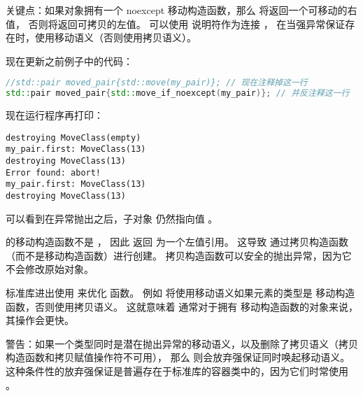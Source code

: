 \documentclass[../../LearnCpp.tex]{subfiles}
\begin{document}
关键点：如果对象拥有一个 noexcept 移动构造函数，那么  将返回一个可移动的右值，
否则将返回可拷贝的左值。
可以使用  说明符作为连接 ，
在当强异常保证存在时，使用移动语义（否则使用拷贝语义）。

现在更新之前例子中的代码：

\begin{lstlisting}[language=C++]
//std::pair moved_pair{std::move(my_pair)}; // 现在注释掉这一行
std::pair moved_pair{std::move_if_noexcept(my_pair)}; // 并反注释这一行
\end{lstlisting}

现在运行程序再打印：

\begin{lstlisting}
destroying MoveClass(empty)
my_pair.first: MoveClass(13)
destroying MoveClass(13)
Error found: abort!
my_pair.first: MoveClass(13)
destroying MoveClass(13)
\end{lstlisting}

可以看到在异常抛出之后，子对象  仍然指向值 。

 的移动构造函数不是 ，
因此  返回  为一个左值引用。
这导致  通过拷贝构造函数（而不是移动构造函数）进行创建。
拷贝构造函数可以安全的抛出异常，因为它不会修改原始对象。

标准库进出使用  来优化  函数。
例如  将使用移动语义如果元素的类型是  移动构造函数，否则使用拷贝语义。
这就意味着  通常对于拥有  移动构造函数的对象来说，其操作会更快。

警告：如果一个类型同时是潜在抛出异常的移动语义，以及删除了拷贝语义（拷贝构造函数和拷贝赋值操作符不可用），
那么  则会放弃强保证同时唤起移动语义。
这种条件性的放弃强保证是普遍存在于标准库的容器类中的，因为它们时常使用 。
\end{document}
